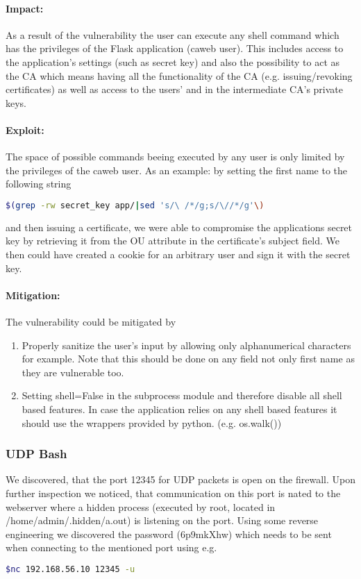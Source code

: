\documentclass[english]{article}
\begin{document}
\paragraph{Impact:} As a result of the vulnerability the user can execute any shell command which has the privileges of the Flask application (caweb user). This includes access to the application's settings (such as secret key) and also the possibility to act as the CA which means having all the functionality of the CA (e.g. issuing/revoking certificates) as well as access to the users' and in the intermediate CA's private keys.

\paragraph{Exploit:}
The space of possible commands beeing executed by any user is only limited by the privileges of the caweb user. As an example: by setting the first name to the following string 
\begin{lstlisting}[language=bash]
$(grep -rw secret_key app/|sed 's/\ /*/g;s/\//*/g'\)
\end{lstlisting}
and then issuing a certificate, we were able to compromise the applications secret key by retrieving it from the OU attribute in the certificate's subject field. We then could have created a cookie for an arbitrary user and sign it with the secret key. 

\paragraph{Mitigation:} The vulnerability could be mitigated by
\begin{enumerate}
\item Properly sanitize the user's input by allowing only alphanumerical characters for example. Note that this should be done on any field not only first name as they are vulnerable too. 
\item Setting shell=False in the subprocess module and therefore disable all shell based features. In case the application relies on any shell based features it should use the wrappers provided by python. (e.g. os.walk())
\end{enumerate}

\subsubsection{UDP Bash}
We discovered, that the port 12345 for UDP packets is open on the firewall. Upon further inspection we noticed, that communication on this port is nated to the webserver where a hidden process (executed by root, located in /home/admin/.hidden/a.out) is listening on the port. Using some reverse engineering we discovered the password (6p9mkXhw) which needs to be sent when connecting to the mentioned port using e.g.
\begin{lstlisting}[language=bash]
$nc 192.168.56.10 12345 -u
\end{lstlisting}
\end{document}
